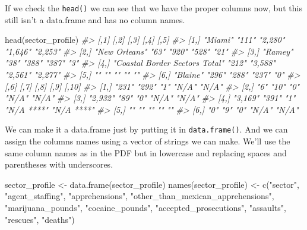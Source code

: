 \documentclass[
]{krantz}
\makeatletter
\newenvironment{Shaded}{\begin{snugshade}}{\end{snugshade}}
\newcommand{\CommentTok}[1]{\textcolor[rgb]{0.37,0.37,0.37}{\textit{#1}}}
\newcommand{\FunctionTok}[1]{\textcolor[rgb]{0,0,0}{#1}}
\newcommand{\NormalTok}[1]{#1}
\newcommand{\OtherTok}[1]{\textcolor[rgb]{0.37,0.37,0.37}{#1}}
\newcommand{\StringTok}[1]{\textcolor[rgb]{0.5,0.5,0.5}{#1}}
\newenvironment{kframe}{%
\medskip{}
\setlength{\fboxsep}{.8em}
 \def\at@end@of@kframe{}%
 \ifinner\ifhmode%
  \def\at@end@of@kframe{\end{minipage}}%
  \begin{minipage}{\columnwidth}%
 \fi\fi%
 \def\FrameCommand##1{\hskip\@totalleftmargin \hskip-\fboxsep
 \colorbox{shadecolor}{##1}\hskip-\fboxsep
     \hskip-\linewidth \hskip-\@totalleftmargin \hskip\columnwidth}%
 \MakeFramed {\advance\hsize-\width
   \@totalleftmargin\z@ \linewidth\hsize
   \@setminipage}}%
 {\par\unskip\endMakeFramed%
 \at@end@of@kframe}
\renewenvironment{Shaded}{\begin{kframe}}{\end{kframe}}
\makeatother
\begin{document}
If we check the \texttt{head()} we can see that we have the proper columns now, but this still isn't a data.frame and has no column names.

\begin{Shaded}
\begin{Highlighting}[]
\FunctionTok{head}\NormalTok{(sector\_profile)}
\CommentTok{\#\textgreater{}      [,1]                           [,2]  [,3]    [,4]    [,5]   }
\CommentTok{\#\textgreater{} [1,] "Miami"                        "111" "2,280" "1,646" "2,253"}
\CommentTok{\#\textgreater{} [2,] "New Orleans"                  "63"  "920"   "528"   "21"   }
\CommentTok{\#\textgreater{} [3,] "Ramey"                        "38"  "388"   "387"   "3"    }
\CommentTok{\#\textgreater{} [4,] "Coastal Border Sectors Total" "212" "3,588" "2,561" "2,277"}
\CommentTok{\#\textgreater{} [5,] ""                             ""    ""      ""      ""     }
\CommentTok{\#\textgreater{} [6,] "Blaine"                       "296" "288"   "237"   "0"    }
\CommentTok{\#\textgreater{}      [,6]    [,7]  [,8] [,9]       [,10]     }
\CommentTok{\#\textgreater{} [1,] "231"   "292" "1"  "N/A"      "N/A"     }
\CommentTok{\#\textgreater{} [2,] "6"     "10"  "0"  "N/A"      "N/A"     }
\CommentTok{\#\textgreater{} [3,] "2,932" "89"  "0"  "N/A"      "N/A"     }
\CommentTok{\#\textgreater{} [4,] "3,169" "391" "1"  "N/A ****" "N/A ****"}
\CommentTok{\#\textgreater{} [5,] ""      ""    ""   ""         ""        }
\CommentTok{\#\textgreater{} [6,] "0"     "9"   "0"  "N/A"      "N/A"}
\end{Highlighting}
\end{Shaded}

We can make it a data.frame just by putting it in \texttt{data.frame()}. And we can assign the columns names using a vector of strings we can make. We'll use the same column names as in the PDF but in lowercase and replacing spaces and parentheses with underscores.

\begin{Shaded}
\begin{Highlighting}[]
\NormalTok{sector\_profile }\OtherTok{\textless{}{-}} \FunctionTok{data.frame}\NormalTok{(sector\_profile)}
\FunctionTok{names}\NormalTok{(sector\_profile) }\OtherTok{\textless{}{-}} \FunctionTok{c}\NormalTok{(}\StringTok{"sector"}\NormalTok{,}
                           \StringTok{"agent\_staffing"}\NormalTok{,}
                           \StringTok{"apprehensions"}\NormalTok{,}
                           \StringTok{"other\_than\_mexican\_apprehensions"}\NormalTok{, }
                           \StringTok{"marijuana\_pounds"}\NormalTok{,}
                           \StringTok{"cocaine\_pounds"}\NormalTok{,}
                           \StringTok{"accepted\_prosecutions"}\NormalTok{,}
                           \StringTok{"assaults"}\NormalTok{,}
                           \StringTok{"rescues"}\NormalTok{,}
                           \StringTok{"deaths"}\NormalTok{)}
\end{Highlighting}
\end{Shaded}
\end{document}

